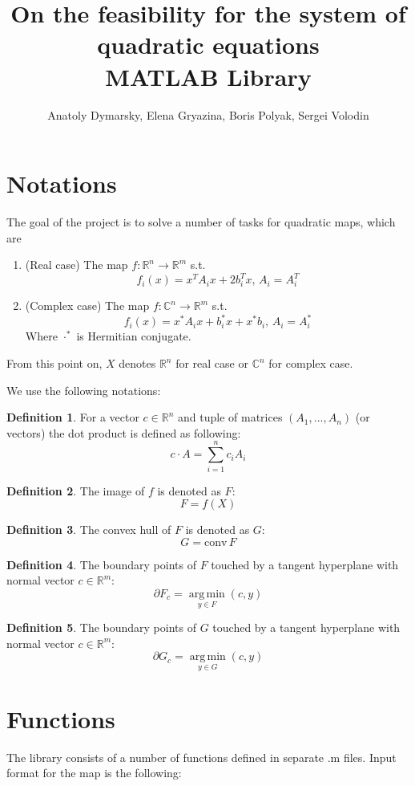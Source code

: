 \documentclass[a4paper]{article}
\title{On the feasibility for the system of quadratic equations\\MATLAB Library}
\date{}
\author{Anatoly Dymarsky, Elena Gryazina, Boris Polyak, Sergei Volodin}
\DeclareMathOperator*{\argmin}{arg\,min}
\newcommand{\conv}{\mbox{conv}\,}
\theoremstyle{definition}
\newtheorem{definition}{Definition}[section]
\begin{document}
\maketitle
\section{Notations}
The goal of the project is to solve a number of tasks for quadratic maps, which are
\begin{enumerate}
\item (Real case) The map $f\colon \mathbb{R}^n\to\mathbb{R}^m$ s.t. $$f_i(x)=x^TA_ix+2b_i^Tx,\, A_i=A_i^T$$
\item (Complex case) The map $f\colon \mathbb{C}^n\to\mathbb{R}^m$ s.t. $$f_i(x)=x^*A_ix+b_i^*x+x^*b_i,\, A_i=A_i^*$$
Where $\cdot^*$ is Hermitian conjugate.
\end{enumerate}

From this point on, $X$ denotes $\mathbb{R}^n$ for real case or $\mathbb{C}^n$ for complex case.

We use the following notations:
\theoremstyle{definition}
\begin{definition} For a vector $c\in\mathbb{R}^n$ and tuple of matrices $(A_1,...,A_n)$ (or vectors) the dot product is defined as following: $$c\cdot A=\sum\limits_{i=1}^nc_iA_i$$
\end{definition}
\begin{definition} The image of $f$ is denoted as $F$:
	$$F=f(X)$$
\end{definition}
\begin{definition} The convex hull of $F$ is denoted as $G$:
	$$G=\conv F$$
\end{definition}
\begin{definition} The boundary points of $F$ touched by a tangent hyperplane with normal vector $c\in\mathbb{R}^m$:
	$$\partial F_c=\argmin\limits_{y\in F}(c,y)$$
\end{definition}
\begin{definition} The boundary points of $G$ touched by a tangent hyperplane with normal vector $c\in\mathbb{R}^m$:
	$$\partial G_c=\argmin\limits_{y\in G}(c,y)$$
\end{definition}
\section{Functions}
The library consists of a number of functions defined in separate .m files. Input format for the map is the following: 
\end{document}
